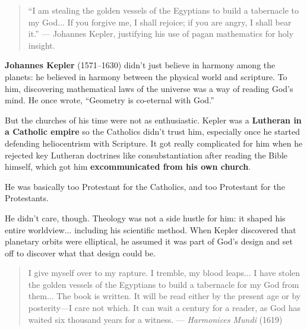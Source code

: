\begin{quote}
``I am stealing the golden vessels of the Egyptians to build a tabernacle to my God... If you forgive me, I shall rejoice; if you are angry, I shall bear it.''
— Johannes Kepler, justifying his use of pagan mathematics for holy insight.
\end{quote}

\begin{tcolorbox}[colback=blue!5!white, colframe=blue!50!black, title=Historical Sidebar: Kepler’s Theology—Excommunicated From All Sides]

  \textbf{Johannes Kepler} (1571–1630) didn’t just believe in harmony among the planets: he believed in harmony between the physical world and scripture. To him, discovering mathematical laws of the universe was a way of reading God’s mind. He once wrote, ``Geometry is co-eternal with God.''

  \medskip

  But the churches of his time were not as enthusiastic.  Kepler was a \textbf{Lutheran in a Catholic empire} so the Catholics didn’t trust him, especially once he started defending heliocentrism with Scripture. It got really complicated for him when he rejected key Lutheran doctrines like consubstantiation after reading the Bible himself, which got him \textbf{excommunicated from his own church}.  

  \medskip
  
  He was basically too Protestant for the Catholics, and too Protestant for the Protestants.

  \medskip

  He didn't care, though. Theology was not a side hustle for him: it shaped his entire worldview... including his scientific method. When Kepler discovered that planetary orbits were elliptical, he assumed it was part of God’s design and set off to discover what that design could be.

  \medskip
  \medskip

  \begin{quote}
  I give myself over to my rapture. I tremble, my blood leaps... I have stolen the golden vessels of the Egyptians to build a tabernacle for my God from them... The book is written. It will be read either by the present age or by posterity—I care not which. It can wait a century for a reader, as God has waited six thousand years for a witness.
  --- \textit{Harmonices Mundi} (1619)
  \end{quote}


\end{tcolorbox}






